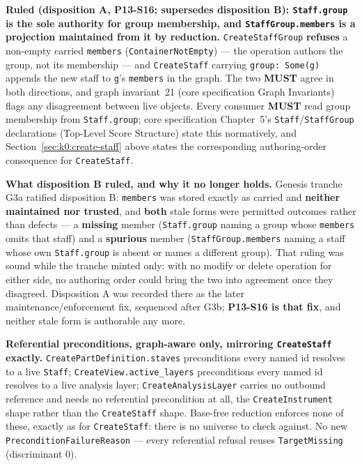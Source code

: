\documentclass[11pt,letterpaper]{report}
\newcommand{\sectionsc}[1]{{\addfontfeatures{Letters=SmallCaps}#1}}
\newcommand{\MUST}{\textbf{MUST}}
\begin{document}
\textbf{Ruled (disposition A, P13-S16; supersedes disposition B):
\texttt{Staff.group} is the sole authority for group membership, and
\texttt{StaffGroup.members} is a projection maintained from it by reduction.}
\texttt{CreateStaffGroup} \textbf{refuses} a non-empty carried \texttt{members}
(\texttt{ContainerNotEmpty}) --- the operation authors the group, not its
membership --- and \texttt{CreateStaff} carrying \texttt{group: Some(g)}
appends the new staff to \texttt{g}'s \texttt{members} in the graph. The two
\MUST{} agree in both directions, and graph invariant~21 (core specification
\sectionsc{Graph Invariants}) flags any disagreement between live objects.
Every consumer \MUST{} read group membership from \texttt{Staff.group}; core
specification Chapter~5's \texttt{Staff}/\texttt{StaffGroup} declarations
(\sectionsc{Top-Level Score Structure}) state this normatively, and
Section~\ref{sec:k0:create-staff} above states the corresponding
authoring-order consequence for \texttt{CreateStaff}.

\textbf{What disposition B ruled, and why it no longer holds.} Genesis tranche
G3a ratified disposition B: \texttt{members} was stored exactly as carried and
\textbf{neither maintained nor trusted}, and \textbf{both} stale forms were
permitted outcomes rather than defects --- a \textbf{missing} member
(\texttt{Staff.group} naming a group whose \texttt{members} omits that staff)
and a \textbf{spurious} member (\texttt{StaffGroup.members} naming a staff
whose own \texttt{Staff.group} is absent or names a different group). That
ruling was sound while the tranche minted only: with no modify or delete
operation for either side, no authoring order could bring the two into
agreement once they disagreed. Disposition A was recorded there as the later
maintenance/enforcement fix, sequenced after G3b; \textbf{P13-S16 is that
fix}, and neither stale form is authorable any more.

\textbf{Referential preconditions, graph-aware only, mirroring
\texttt{CreateStaff} exactly.} \texttt{CreatePartDefinition.staves}
preconditions every named id resolves to a live \texttt{Staff};
\texttt{CreateView.active\_layers}
preconditions every named id resolves to a live analysis layer;
\texttt{CreateAnalysisLayer} carries no outbound reference and needs no
referential precondition at all, the \texttt{CreateInstrument} shape rather
than the \texttt{CreateStaff} shape. Base-free reduction enforces none of
these, exactly as for \texttt{CreateStaff}: there is no universe to check
against. No new \texttt{PreconditionFailureReason} --- every referential
refusal reuses \texttt{TargetMissing} (discriminant 0).
\end{document}
